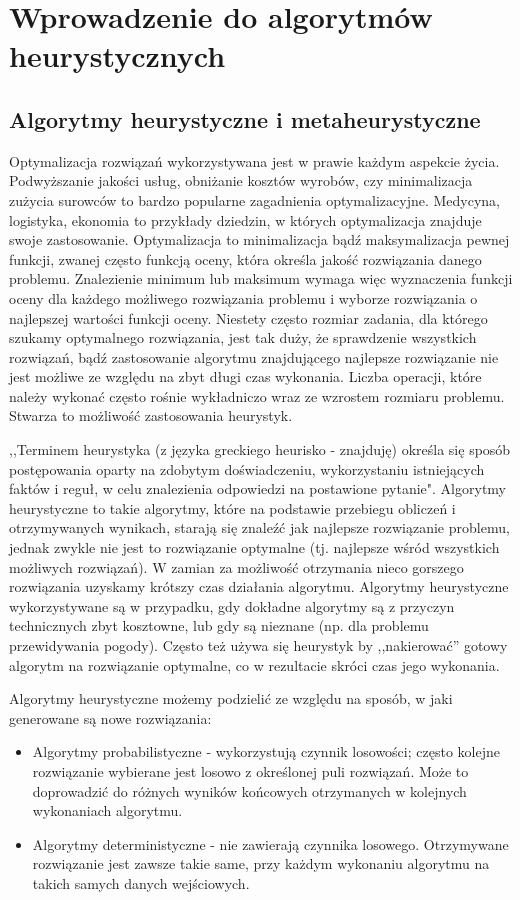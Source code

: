

\chapter{Wprowadzenie do algorytmów heurystycznych}
\section{Algorytmy heurystyczne i metaheurystyczne}
 Optymalizacja rozwiązań wykorzystywana jest w prawie każdym aspekcie życia. Podwyższanie jakości usług, obniżanie kosztów wyrobów, czy minimalizacja zużycia surowców to bardzo popularne zagadnienia optymalizacyjne. Medycyna, logistyka, ekonomia to przykłady dziedzin, w których optymalizacja znajduje swoje zastosowanie. 
 Optymalizacja to minimalizacja bądź maksymalizacja pewnej funkcji, zwanej często funkcją oceny, która określa jakość rozwiązania danego problemu. Znalezienie minimum lub maksimum wymaga więc wyznaczenia funkcji oceny dla każdego możliwego rozwiązania problemu i wyborze rozwiązania o najlepszej wartości funkcji oceny. Niestety często rozmiar zadania, dla którego szukamy optymalnego rozwiązania, jest tak duży, że sprawdzenie wszystkich rozwiązań, bądź zastosowanie algorytmu znajdującego najlepsze rozwiązanie nie jest możliwe ze względu na zbyt długi czas wykonania. Liczba operacji, które należy wykonać często rośnie wykładniczo wraz ze wzrostem rozmiaru problemu. Stwarza to możliwość zastosowania heurystyk.
 
 ,,Terminem heurystyka (z języka greckiego heurisko - znajduję) określa się sposób postępowania oparty na zdobytym doświadczeniu, wykorzystaniu istniejących faktów i reguł, w celu znalezienia odpowiedzi na postawione pytanie"\cite{Algorytmy:Widuch}. Algorytmy heurystyczne to takie algorytmy, które na podstawie przebiegu obliczeń i otrzymywanych wynikach, starają się znaleźć jak najlepsze rozwiązanie problemu, jednak zwykle nie jest to rozwiązanie optymalne (tj. najlepsze wśród wszystkich możliwych rozwiązań). W zamian za możliwość otrzymania nieco gorszego rozwiązania uzyskamy krótszy czas działania algorytmu. Algorytmy heurystyczne wykorzystywane są w przypadku, gdy dokładne algorytmy są z przyczyn technicznych zbyt kosztowne, lub gdy są nieznane (np. dla problemu przewidywania pogody). Często też używa się heurystyk by ,,nakierować'' gotowy algorytm na rozwiązanie optymalne, co w rezultacie skróci czas jego wykonania.
 
 Algorytmy heurystyczne możemy podzielić ze względu na sposób, w jaki generowane są nowe rozwiązania:
 \begin{itemize}
 	\item Algorytmy probabilistyczne - wykorzystują czynnik losowości; często kolejne rozwiązanie wybierane jest losowo z określonej puli rozwiązań. Może to doprowadzić do różnych wyników końcowych otrzymanych w kolejnych wykonaniach algorytmu.
 	\item Algorytmy deterministyczne - nie zawierają czynnika losowego. Otrzymywane rozwiązanie jest zawsze takie same, przy każdym wykonaniu algorytmu na takich samych danych wejściowych. 	
 \end{itemize}


